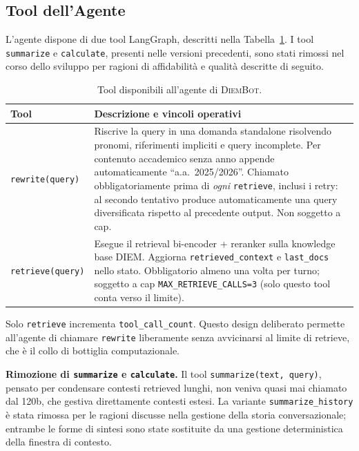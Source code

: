 \documentclass[11pt,a4paper]{article}
\newcommand{\code}[1]{\texttt{\small#1}}
\newcommand{\sys}{\textsc{DiemBot}}
\begin{document}
\subsection{Tool dell'Agente}
\label{sec:tools}

L'agente dispone di due tool LangGraph, descritti nella Tabella~\ref{tab:tools}. I tool
\code{summarize} e \code{calculate}, presenti nelle versioni precedenti, sono stati
rimossi nel corso dello sviluppo per ragioni di affidabilità e qualità descritte di
seguito.

\begin{table}[htbp]
\centering
\caption{Tool disponibili all'agente di \sys{}.}
\label{tab:tools}
\small
\begin{tabularx}{\textwidth}{lX}
\toprule
\textbf{Tool} & \textbf{Descrizione e vincoli operativi} \\
\midrule
\code{rewrite(query)} & Riscrive la query in una domanda standalone risolvendo
                        pronomi, riferimenti impliciti e query incomplete. Per contenuto
                        accademico senza anno appende automaticamente
                        ``a.a.\ 2025/2026''. Chiamato obbligatoriamente prima di
                        \emph{ogni} \code{retrieve}, inclusi i retry: al secondo
                        tentativo produce automaticamente una query diversificata
                        rispetto al precedente output. Non soggetto a cap. \\
\addlinespace
\code{retrieve(query)} & Esegue il retrieval bi-encoder + reranker sulla knowledge base
                         DIEM. Aggiorna \code{retrieved\_context} e \code{last\_docs} nello stato.
                         Obbligatorio almeno una volta per turno; soggetto a cap
                         \code{MAX\_RETRIEVE\_CALLS=3} (solo questo tool conta verso il limite). \\
\bottomrule
\end{tabularx}
\end{table}

Solo \code{retrieve} incrementa \code{tool\_call\_count}. Questo design deliberato
permette all'agente di chiamare \code{rewrite} liberamente senza avvicinarsi al
limite di retrieve, che è il collo di bottiglia computazionale.

\textbf{Rimozione di \texttt{summarize} e \texttt{calculate}.} Il tool
\code{summarize(text, query)}, pensato per condensare contesti retrieved lunghi, non
veniva quasi mai chiamato dal 120b, che gestiva direttamente contesti estesi. La variante
\code{summarize\_history} è stata rimossa per le ragioni discusse nella gestione della
storia conversazionale; entrambe le forme di sintesi sono state sostituite da una gestione
deterministica della finestra di contesto.
\end{document}
